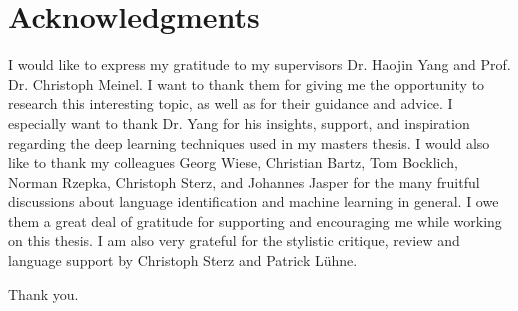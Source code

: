 \section*{\LARGE Acknowledgments}
I would like to express my gratitude to my supervisors Dr. Haojin Yang and Prof. Dr. Christoph Meinel. I want to thank them for giving me the opportunity to research this interesting topic, as well as for their guidance and advice. I especially want to thank Dr. Yang for his insights, support, and inspiration regarding the deep learning techniques used in my masters thesis.
I would also like to thank my colleagues Georg Wiese, Christian Bartz, Tom Bocklich, Norman Rzepka, Christoph Sterz, and Johannes Jasper for the many fruitful discussions about language identification and machine learning in general. I owe them a great deal of gratitude for supporting and encouraging me while working on this thesis. I am also very grateful for the stylistic critique, review and language support by Christoph Sterz and Patrick Lühne.

Thank you.

